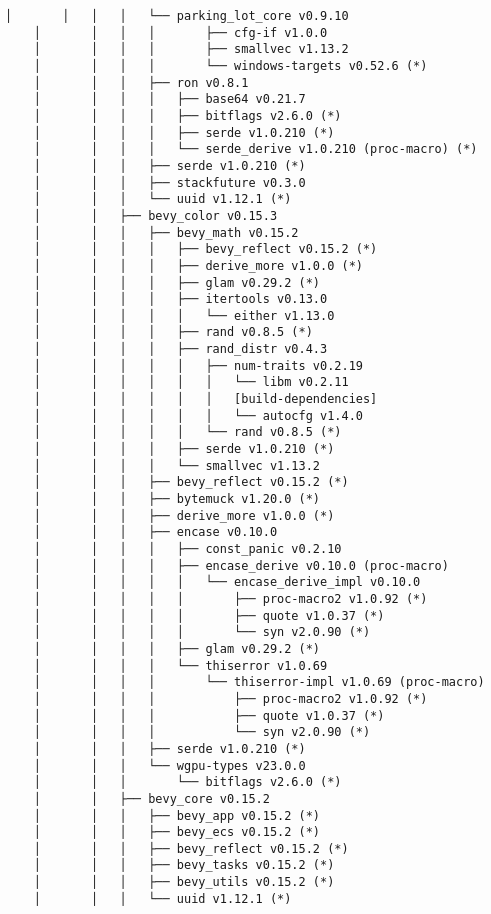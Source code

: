 \begin{lstlisting}[style=mystyle, caption={dependencias del proyecto}, label={lst:dependencias}]
    │       │   │   │   └── parking_lot_core v0.9.10
    │       │   │   │       ├── cfg-if v1.0.0
    │       │   │   │       ├── smallvec v1.13.2
    │       │   │   │       └── windows-targets v0.52.6 (*)
    │       │   │   ├── ron v0.8.1
    │       │   │   │   ├── base64 v0.21.7
    │       │   │   │   ├── bitflags v2.6.0 (*)
    │       │   │   │   ├── serde v1.0.210 (*)
    │       │   │   │   └── serde_derive v1.0.210 (proc-macro) (*)
    │       │   │   ├── serde v1.0.210 (*)
    │       │   │   ├── stackfuture v0.3.0
    │       │   │   └── uuid v1.12.1 (*)
    │       │   ├── bevy_color v0.15.3
    │       │   │   ├── bevy_math v0.15.2
    │       │   │   │   ├── bevy_reflect v0.15.2 (*)
    │       │   │   │   ├── derive_more v1.0.0 (*)
    │       │   │   │   ├── glam v0.29.2 (*)
    │       │   │   │   ├── itertools v0.13.0
    │       │   │   │   │   └── either v1.13.0
    │       │   │   │   ├── rand v0.8.5 (*)
    │       │   │   │   ├── rand_distr v0.4.3
    │       │   │   │   │   ├── num-traits v0.2.19
    │       │   │   │   │   │   └── libm v0.2.11
    │       │   │   │   │   │   [build-dependencies]
    │       │   │   │   │   │   └── autocfg v1.4.0
    │       │   │   │   │   └── rand v0.8.5 (*)
    │       │   │   │   ├── serde v1.0.210 (*)
    │       │   │   │   └── smallvec v1.13.2
    │       │   │   ├── bevy_reflect v0.15.2 (*)
    │       │   │   ├── bytemuck v1.20.0 (*)
    │       │   │   ├── derive_more v1.0.0 (*)
    │       │   │   ├── encase v0.10.0
    │       │   │   │   ├── const_panic v0.2.10
    │       │   │   │   ├── encase_derive v0.10.0 (proc-macro)
    │       │   │   │   │   └── encase_derive_impl v0.10.0
    │       │   │   │   │       ├── proc-macro2 v1.0.92 (*)
    │       │   │   │   │       ├── quote v1.0.37 (*)
    │       │   │   │   │       └── syn v2.0.90 (*)
    │       │   │   │   ├── glam v0.29.2 (*)
    │       │   │   │   └── thiserror v1.0.69
    │       │   │   │       └── thiserror-impl v1.0.69 (proc-macro)
    │       │   │   │           ├── proc-macro2 v1.0.92 (*)
    │       │   │   │           ├── quote v1.0.37 (*)
    │       │   │   │           └── syn v2.0.90 (*)
    │       │   │   ├── serde v1.0.210 (*)
    │       │   │   └── wgpu-types v23.0.0
    │       │   │       └── bitflags v2.6.0 (*)
    │       │   ├── bevy_core v0.15.2
    │       │   │   ├── bevy_app v0.15.2 (*)
    │       │   │   ├── bevy_ecs v0.15.2 (*)
    │       │   │   ├── bevy_reflect v0.15.2 (*)
    │       │   │   ├── bevy_tasks v0.15.2 (*)
    │       │   │   ├── bevy_utils v0.15.2 (*)
    │       │   │   └── uuid v1.12.1 (*)

\end{lstlisting}
